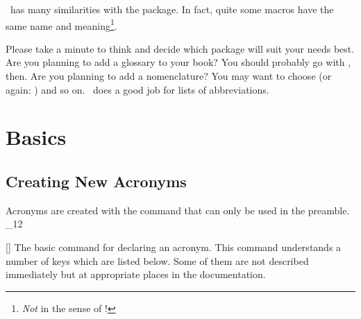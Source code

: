 \documentclass[load-preamble+,scrartcl={DIV10}]{cnltx-doc}
\makeatletter
\renewenvironment{commands}
  {%
    \cnltx@set@catcode_{12}%
    \let\command\cnltx@command
    \cnltxlist
  }
  {\endcnltxlist}
\makeatother
\begin{document}
\acro\ has many similarities with the  package.  In fact, quite
some macros have the same name and meaning\footnote{\emph{Not} in the sense of
  !}.

Please take a minute to think and decide which package will suit your needs
best.  Are you planning to add a glossary to your book?  You should probably
go with , then.  Are you planning to add a nomenclature?  You
may want to choose  (or again: ) and so on.
\acro\ does a good job for lists of abbreviations.

\section{Basics}
\subsection{Creating New Acronyms}
\noindent{}Acronyms are created with the command
 that can only be used in the preamble.
\begin{commands}
  \command{DeclareAcronym}[]
    The basic command for declaring an acronym.
\end{commands}
This command understands a number of keys which are listed below.  Some of
them are not described immediately but at appropriate places in the
documentation.
\end{document}

